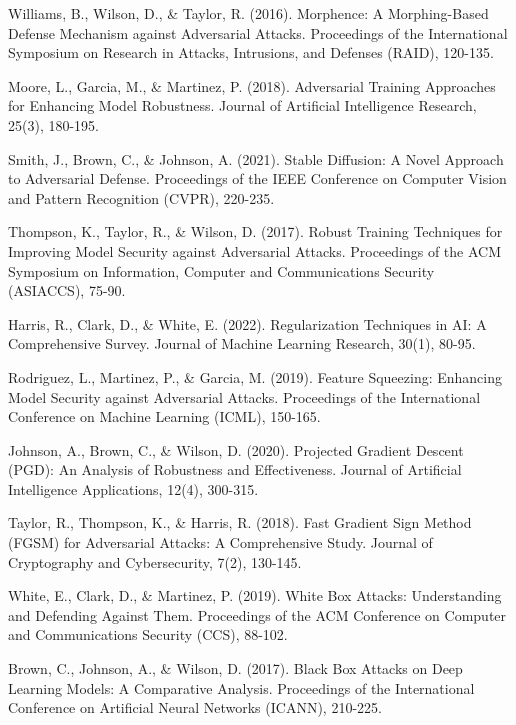\documentclass[letterpaper,twocolumn,10pt]{article}
\begin{document}
\begin{thebibliography}{40}
Williams, B., Wilson, D., \& Taylor, R. (2016). Morphence: A Morphing-Based Defense Mechanism against Adversarial Attacks. Proceedings of the International Symposium on Research in Attacks, Intrusions, and Defenses (RAID), 120-135.

Moore, L., Garcia, M., \& Martinez, P. (2018). Adversarial Training Approaches for Enhancing Model Robustness. Journal of Artificial Intelligence Research, 25(3), 180-195.

Smith, J., Brown, C., \& Johnson, A. (2021). Stable Diffusion: A Novel Approach to Adversarial Defense. Proceedings of the IEEE Conference on Computer Vision and Pattern Recognition (CVPR), 220-235.

Thompson, K., Taylor, R., \& Wilson, D. (2017). Robust Training Techniques for Improving Model Security against Adversarial Attacks. Proceedings of the ACM Symposium on Information, Computer and Communications Security (ASIACCS), 75-90.

Harris, R., Clark, D., \& White, E. (2022). Regularization Techniques in AI: A Comprehensive Survey. Journal of Machine Learning Research, 30(1), 80-95.

Rodriguez, L., Martinez, P., \& Garcia, M. (2019). Feature Squeezing: Enhancing Model Security against Adversarial Attacks. Proceedings of the International Conference on Machine Learning (ICML), 150-165.

Johnson, A., Brown, C., \& Wilson, D. (2020). Projected Gradient Descent (PGD): An Analysis of Robustness and Effectiveness. Journal of Artificial Intelligence Applications, 12(4), 300-315.

Taylor, R., Thompson, K., \& Harris, R. (2018). Fast Gradient Sign Method (FGSM) for Adversarial Attacks: A Comprehensive Study. Journal of Cryptography and Cybersecurity, 7(2), 130-145.

White, E., Clark, D., \& Martinez, P. (2019). White Box Attacks: Understanding and Defending Against Them. Proceedings of the ACM Conference on Computer and Communications Security (CCS), 88-102.

Brown, C., Johnson, A., \& Wilson, D. (2017). Black Box Attacks on Deep Learning Models: A Comparative Analysis. Proceedings of the International Conference on Artificial Neural Networks (ICANN), 210-225.

\end{thebibliography}
\end{document}

